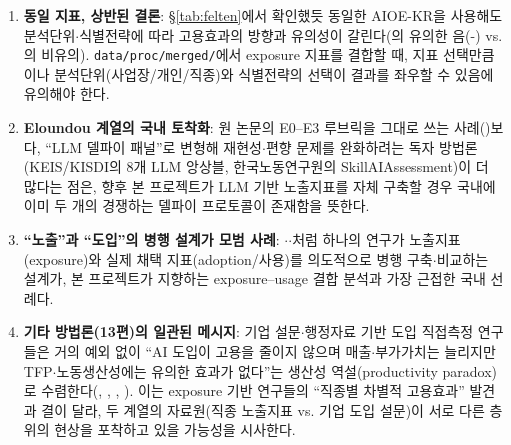 \documentclass[11pt]{article}
\begin{document}
\begin{enumerate}[label=\arabic*.]
  \item \textbf{동일 지표, 상반된 결론}: \S\ref{tab:felten}에서 확인했듯 동일한 AIOE-KR을 사용해도 분석단위$\cdot$식별전략에 따라 고용효과의 방향과 유의성이 갈린다(\citet{kiet-2025-ai-occupational-employment-effect}의 유의한 음(-) vs. \citet{noh-2025-ai-labor-coexistence}의 비유의). \texttt{data/proc/merged/}에서 exposure 지표를 결합할 때, 지표 선택만큼이나 분석단위(사업장/개인/직종)와 식별전략의 선택이 결과를 좌우할 수 있음에 유의해야 한다.
  \item \textbf{Eloundou 계열의 국내 토착화}: 원 논문의 E0--E3 루브릭을 그대로 쓰는 사례(\citet{cheon-2025-ai-exposure-vs-ai-adoption})보다, ``LLM 델파이 패널''로 변형해 재현성$\cdot$편향 문제를 완화하려는 독자 방법론(KEIS/KISDI의 8개 LLM 앙상블, 한국노동연구원의 SkillAIAssessment)이 더 많다는 점은, 향후 본 프로젝트가 LLM 기반 노출지표를 자체 구축할 경우 국내에 이미 두 개의 경쟁하는 델파이 프로토콜이 존재함을 뜻한다.
  \item \textbf{``노출''과 ``도입''의 병행 설계가 모범 사례}: \citet{chang-2024-ai-development-employment-effects}$\cdot$\citet{chang-2025-ai-era-skills}$\cdot$\citet{cheon-2025-ai-exposure-vs-ai-adoption}처럼 하나의 연구가 노출지표(exposure)와 실제 채택 지표(adoption/사용)를 의도적으로 병행 구축$\cdot$비교하는 설계가, 본 프로젝트가 지향하는 exposure--usage 결합 분석과 가장 근접한 국내 선례다.
  \item \textbf{기타 방법론(13편)의 일관된 메시지}: 기업 설문$\cdot$행정자료 기반 도입 직접측정 연구들은 거의 예외 없이 ``AI 도입이 고용을 줄이지 않으며 매출$\cdot$부가가치는 늘리지만 TFP$\cdot$노동생산성에는 유의한 효과가 없다''는 생산성 역설(productivity paradox)로 수렴한다(\citet{kiet-2021-ai-adoption-productivity}, \citet{kiet-2024-ai-adoption-firms-policy}, \citet{kim-2025-ai-adoption-firm-performance}, \citet{lee-2025-ai-adoption-determinants-performance}). 이는 exposure 기반 연구들의 ``직종별 차별적 고용효과'' 발견과 결이 달라, 두 계열의 자료원(직종 노출지표 vs. 기업 도입 설문)이 서로 다른 층위의 현상을 포착하고 있을 가능성을 시사한다.
\end{enumerate}

\printbibliography
\end{document}
